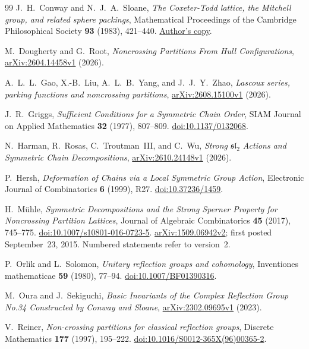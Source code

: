 \documentclass[11pt]{article}
\theoremstyle{definition}
\begin{document}
\begin{thebibliography}{99}
J.~H.~Conway and N.~J.~A.~Sloane, \emph{The Coxeter-Todd lattice, the
Mitchell group, and related sphere packings}, Mathematical Proceedings
of the Cambridge Philosophical Society \textbf{93} (1983), 421--440.
\href{https://neilsloane.com/doc/Me107.pdf}{Author's copy}.

M.~Dougherty and G.~Root, \emph{Noncrossing Partitions From Hull
Configurations}, \href{https://arxiv.org/abs/2604.14458v1}{arXiv:2604.14458v1}
(2026).

A.~L.~L.~Gao, X.-B.~Liu, A.~L.~B.~Yang, and J.~J.~Y.~Zhao,
\emph{Lascoux series, parking functions and noncrossing partitions},
\href{https://arxiv.org/abs/2608.15100v1}{arXiv:2608.15100v1} (2026).

J.~R.~Griggs, \emph{Sufficient Conditions for a Symmetric Chain Order},
SIAM Journal on Applied Mathematics \textbf{32} (1977), 807--809.
\href{https://doi.org/10.1137/0132068}{doi:10.1137/0132068}.

N.~Harman, R.~Rosas, C.~Troutman~III, and C.~Wu,
\emph{Strong $\mathfrak{sl}_2$ Actions and Symmetric Chain Decompositions},
\href{https://arxiv.org/abs/2610.24148v1}{arXiv:2610.24148v1} (2026).

P.~Hersh, \emph{Deformation of Chains via a Local Symmetric Group
Action}, Electronic Journal of Combinatorics \textbf{6} (1999), R27.
\href{https://doi.org/10.37236/1459}{doi:10.37236/1459}.

H.~M\"uhle, \emph{Symmetric Decompositions and the Strong Sperner
Property for Noncrossing Partition Lattices}, Journal of Algebraic
Combinatorics \textbf{45} (2017), 745--775.
\href{https://doi.org/10.1007/s10801-016-0723-5}{doi:10.1007/s10801-016-0723-5}.
\href{https://arxiv.org/abs/1509.06942v2}{arXiv:1509.06942v2}; first
posted September~23, 2015. Numbered statements refer to version~2.

P.~Orlik and L.~Solomon, \emph{Unitary reflection groups and cohomology},
Inventiones mathematicae \textbf{59} (1980), 77--94.
\href{https://doi.org/10.1007/BF01390316}{doi:10.1007/BF01390316}.

M.~Oura and J.~Sekiguchi, \emph{Basic Invariants of the Complex
Reflection Group No.34 Constructed by Conway and Sloane},
\href{https://arxiv.org/abs/2302.09695v1}{arXiv:2302.09695v1} (2023).

V.~Reiner, \emph{Non-crossing partitions for classical reflection
groups}, Discrete Mathematics \textbf{177} (1997), 195--222.
\href{https://doi.org/10.1016/S0012-365X(96)00365-2}{doi:10.1016/S0012-365X(96)00365-2}.


\end{thebibliography}
\end{document}
